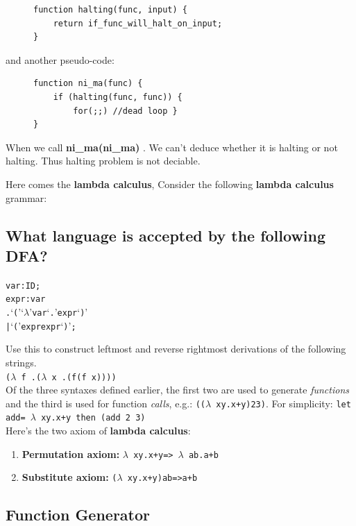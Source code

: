 \documentclass[a4paper]{exam}
\begin{document}
\begin{figure}[H]
    \begin{verbatim}
function halting(func, input) {
    return if_func_will_halt_on_input;
}
    \end{verbatim}
\end{figure}
and another pseudo-code:
\begin{figure}[H]
     \begin{verbatim}
function ni_ma(func) {
    if (halting(func, func)) {
        for(;;) //dead loop }
}
    \end{verbatim}
\end{figure}

When we call \textbf { ni\_ma(ni\_ma) }. We can't deduce whether it is halting or not halting. Thus halting problem is not deciable.


Here comes the \textbf{lambda calculus}, Consider the following \textbf{lambda calculus} grammar:
\subsection{What language is accepted by the following DFA?}
\begin{alltt}
var  : ID ;
expr : var
     . ‘(’ ‘\(\lambda\)’ var ‘.’ expr ‘)’
     | ‘(’ expr expr ‘)’ ;
\end{alltt}

Use this \cite{lambdacpptest} to construct leftmost and reverse rightmost derivations of the following strings.
\\
\texttt{($\lambda$ f .($\lambda$ x .(f(f x))))}
\\
Of the three syntaxes defined earlier, the first two are used to generate \textit{functions} and the third is used for function \textit{calls}, e.g.:  \texttt{(($\lambda$ xy.x+y)23)}. For simplicity:  \texttt{let add= $\lambda$ xy.x+y then (add 2 3)}\\

Here's the two axiom of \textbf{lambda calculus}:
\begin{enumerate}
\item \textbf{Permutation axiom:} \texttt{$\lambda$ xy.x+y=> $\lambda$ ab.a+b}
\item \textbf{Substitute axiom:} \texttt{($\lambda$ xy.x+y)ab=>a+b}
\end{enumerate}

\subsection{Function Generator}
\end{document}

